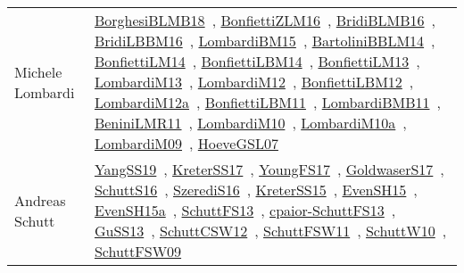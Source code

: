 {\begin{longtable}{p{4cm}p{20cm}}
Michele Lombardi & \href{articles/BorghesiBLMB18.pdf}{BorghesiBLMB18}~\cite{BorghesiBLMB18}, \href{papers/BonfiettiZLM16.pdf}{BonfiettiZLM16}~\cite{BonfiettiZLM16}, \href{articles/BridiBLMB16.pdf}{BridiBLMB16}~\cite{BridiBLMB16}, \href{papers/BridiLBBM16.pdf}{BridiLBBM16}~\cite{BridiLBBM16}, \href{papers/LombardiBM15.pdf}{LombardiBM15}~\cite{LombardiBM15}, \href{papers/BartoliniBBLM14.pdf}{BartoliniBBLM14}~\cite{BartoliniBBLM14}, \href{papers/BonfiettiLM14.pdf}{BonfiettiLM14}~\cite{BonfiettiLM14}, \href{articles/BonfiettiLBM14.pdf}{BonfiettiLBM14}~\cite{BonfiettiLBM14}, \href{papers/BonfiettiLM13.pdf}{BonfiettiLM13}~\cite{BonfiettiLM13}, \href{papers/LombardiM13.pdf}{LombardiM13}~\cite{LombardiM13}, \href{articles/LombardiM12.pdf}{LombardiM12}~\cite{LombardiM12}, \href{papers/BonfiettiLBM12.pdf}{BonfiettiLBM12}~\cite{BonfiettiLBM12}, \href{articles/LombardiM12a.pdf}{LombardiM12a}~\cite{LombardiM12a}, \href{papers/BonfiettiLBM11.pdf}{BonfiettiLBM11}~\cite{BonfiettiLBM11}, \href{papers/LombardiBMB11.pdf}{LombardiBMB11}~\cite{LombardiBMB11}, \href{articles/BeniniLMR11.pdf}{BeniniLMR11}~\cite{BeniniLMR11}, \href{papers/LombardiM10.pdf}{LombardiM10}~\cite{LombardiM10}, \href{articles/LombardiM10a.pdf}{LombardiM10a}~\cite{LombardiM10a}, \href{papers/LombardiM09.pdf}{LombardiM09}~\cite{LombardiM09}, \href{papers/HoeveGSL07.pdf}{HoeveGSL07}~\cite{HoeveGSL07}\\
Andreas Schutt & \href{papers/YangSS19.pdf}{YangSS19}~\cite{YangSS19}, \href{articles/KreterSS17.pdf}{KreterSS17}~\cite{KreterSS17}, \href{papers/YoungFS17.pdf}{YoungFS17}~\cite{YoungFS17}, \href{papers/GoldwaserS17.pdf}{GoldwaserS17}~\cite{GoldwaserS17}, \href{papers/SchuttS16.pdf}{SchuttS16}~\cite{SchuttS16}, \href{papers/SzerediS16.pdf}{SzerediS16}~\cite{SzerediS16}, \href{papers/KreterSS15.pdf}{KreterSS15}~\cite{KreterSS15}, \href{papers/EvenSH15.pdf}{EvenSH15}~\cite{EvenSH15}, \href{articles/EvenSH15a.pdf}{EvenSH15a}~\cite{EvenSH15a}, \href{papers/SchuttFS13.pdf}{SchuttFS13}~\cite{SchuttFS13}, \href{papers/cpaior-SchuttFS13.pdf}{cpaior-SchuttFS13}~\cite{cpaior-SchuttFS13}, \href{papers/GuSS13.pdf}{GuSS13}~\cite{GuSS13}, \href{papers/SchuttCSW12.pdf}{SchuttCSW12}~\cite{SchuttCSW12}, \href{articles/SchuttFSW11.pdf}{SchuttFSW11}~\cite{SchuttFSW11}, \href{papers/SchuttW10.pdf}{SchuttW10}~\cite{SchuttW10}, \href{papers/SchuttFSW09.pdf}{SchuttFSW09}~\cite{SchuttFSW09}\\

\end{longtable}}
